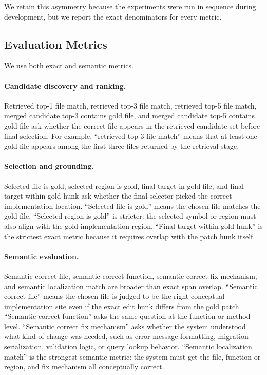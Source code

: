 \documentclass[11pt]{article}
\begin{document}
We retain this asymmetry because the experiments were run in sequence during development, but we report the exact denominators for every metric.

\subsection{Evaluation Metrics}

We use both exact and semantic metrics.

\paragraph{Candidate discovery and ranking.}
Retrieved top-1 file match, retrieved top-3 file match, retrieved top-5 file match, merged candidate top-3 contains gold file, and merged candidate top-5 contains gold file ask whether the correct file appears in the retrieved candidate set before final selection. For example, ``retrieved top-3 file match'' means that at least one gold file appears among the first three files returned by the retrieval stage.

\paragraph{Selection and grounding.}
Selected file is gold, selected region is gold, final target in gold file, and final target within gold hunk ask whether the final selector picked the correct implementation location. ``Selected file is gold'' means the chosen file matches the gold file. ``Selected region is gold'' is stricter: the selected symbol or region must also align with the gold implementation region. ``Final target within gold hunk'' is the strictest exact metric because it requires overlap with the patch hunk itself.

\paragraph{Semantic evaluation.}
Semantic correct file, semantic correct function, semantic correct fix mechanism, and semantic localization match are broader than exact span overlap. ``Semantic correct file'' means the chosen file is judged to be the right conceptual implementation site even if the exact edit hunk differs from the gold patch. ``Semantic correct function'' asks the same question at the function or method level. ``Semantic correct fix mechanism'' asks whether the system understood what kind of change was needed, such as error-message formatting, migration serialization, validation logic, or query lookup behavior. ``Semantic localization match'' is the strongest semantic metric: the system must get the file, function or region, and fix mechanism all conceptually correct.
\end{document}
